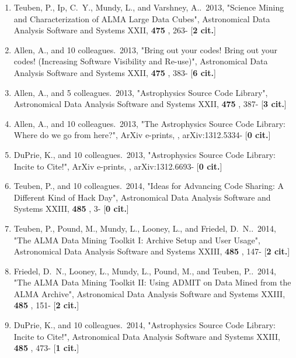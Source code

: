 \documentclass[11pt,letterpaper]{article}
\begin{document}
\begin{enumerate}[resume,label=\textbf{\arabic*}.]
\item  
Teuben, P., Ip, C.~Y., Mundy, L., and Varshney, A..\  2013,  "Science 
Mining and Characterization of ALMA Large Data Cubes", Astronomical Data 
Analysis Software and Systems XXII,  {\bf 475} , 263- [{\bf 2 cit.}] 

\item  
Allen, A., and 10 colleagues.\  2013,  "Bring out your codes! Bring out 
your codes! (Increasing Software Visibility and Re-use)", Astronomical Data 
Analysis Software and Systems XXII,  {\bf 475} , 383- [{\bf 6 cit.}] 

\item  
Allen, A., and 5 colleagues.\  2013,  "Astrophysics Source Code Library", 
Astronomical Data Analysis Software and Systems XXII,  {\bf 475} , 387- 
[{\bf 3 cit.}] 

\item  
Allen, A., and 10 colleagues.\  2013,  "The Astrophysics Source Code 
Library: Where do we go from here?", ArXiv e-prints,  , arXiv:1312.5334- 
[{\bf 0 cit.}] 

\item  
DuPrie, K., and 10 colleagues.\  2013,  "Astrophysics Source Code Library: 
Incite to Cite!", ArXiv e-prints,  , arXiv:1312.6693- [{\bf 0 cit.}] 


\item  
Teuben, P., and 10 colleagues.\  2014,  "Ideas for Advancing Code Sharing: 
A Different Kind of Hack Day", Astronomical Data Analysis Software and 
Systems XXIII,  {\bf 485} , 3- [{\bf 0 cit.}] 

\item  
Teuben, P., Pound, M., Mundy, L., Looney, L., and Friedel, D.~N..\  2014,  
"The ALMA Data Mining Toolkit I: Archive Setup and User Usage", 
Astronomical Data Analysis Software and Systems XXIII,  {\bf 485} , 147- 
[{\bf 2 cit.}] 

\item  
Friedel, D.~N., Looney, L., Mundy, L., Pound, M., and Teuben, P..\  2014,  
"The ALMA Data Mining Toolkit II: Using ADMIT on Data Mined from the ALMA 
Archive", Astronomical Data Analysis Software and Systems XXIII,  {\bf 485} 
, 151- [{\bf 2 cit.}] 

\item  
DuPrie, K., and 10 colleagues.\  2014,  "Astrophysics Source Code Library: 
Incite to Cite!", Astronomical Data Analysis Software and Systems XXIII,  
{\bf 485} , 473- [{\bf 1 cit.}] 


\end{enumerate}
\end{document}

